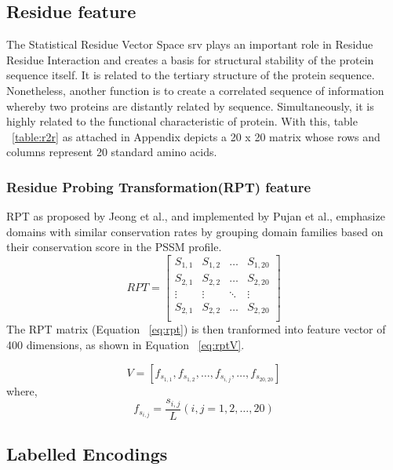   
  \subsection{Residue feature} 
  The Statistical Residue Vector Space \acrshort{srv} \cite{Wong2018} plays an important role in Residue Residue Interaction and creates a basis for structural stability of the protein sequence itself. It is related to the tertiary structure of the protein sequence. Nonetheless, another function is to create a correlated sequence of information whereby two proteins are distantly related by sequence. Simultaneously, it is highly related to the functional characteristic of protein.  With this, table ~\ref{table:r2r} as attached in Appendix depicts a 20 x 20 matrix whose rows and columns represent 20 standard amino acids.
  
  \subsubsection{Residue Probing Transformation(RPT) feature}
  RPT as proposed by Jeong et al.\cite{Jeong2011}, and implemented by Pujan et al.\cite{Mishra2019}, emphasize domains with similar conservation rates by grouping domain families based on their conservation score in the PSSM profile.
  \begin{equation}
    RPT = \begin{bmatrix}
      S_{1,1} & S_{1,2} & \dots & S_{1,20} \\
      S_{2,1} & S_{2,2} & \dots & S_{2,20} \\
      \vdots  & \vdots  & \ddots & \vdots \\
      S_{2,1} & S_{2,2} & \dots & S_{2,20} \\
    \end{bmatrix}
    \label{eq:rpt}
  \end{equation}
  The RPT matrix (Equation ~\ref{eq:rpt}) is then tranformed into feature vector of 400 dimensions, as shown in Equation ~\ref{eq:rptV}.
  
  \begin{equation}
    V = [ f_{s_{1,1}}, f_{s_{1,2}}, \dots, f_{s_{i,j}}, \dots, f_{s_{20,20}} ]
    \label{eq:rptV}
  \end{equation}
  where, 
  \begin{equation}
    f_{s_{i,j}} = \frac{s_{i,j}}{L} (i,j = 1,2,\dots,20)
    \label{eq:rptF}
  \end{equation}

  \subsection{Labelled Encodings}
  
